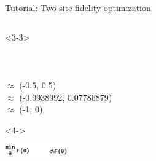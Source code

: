 \begin{frame}[fragile]{Tutorial: Two-site fidelity optimization}
\begin{columns}
\begin{column}{5cm}
\begin{onlyenv}<3-3>
~\\
~\\
~\\
~\\
$\approx$ (-0.5, 0.5) \\
$\approx$ (-0.9938992, 0.07786879) \\
    $\approx$ (-1, 0)
\end{onlyenv}

\begin{onlyenv}<4->
\vspace*{0.0cm}
\begin{center}
\includegraphics[width=0.2\textwidth]{
  slides/assets/min_grad_F_theta.png
}
\end{center}
\vspace*{0.0cm}
\end{onlyenv}

\end{column}

\end{columns}

\end{frame}
